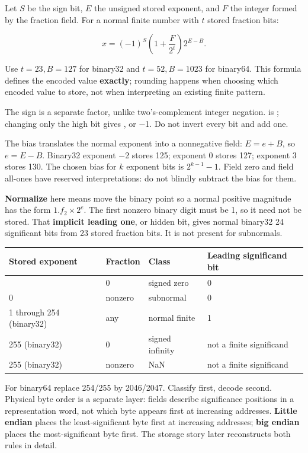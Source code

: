 Let \(S\) be the sign bit, \(E\) the unsigned stored exponent, and \(F\) the integer formed by the fraction field. For a normal finite number with \(t\) stored fraction bits:

\[
x=(-1)^S\left(1+\frac{F}{2^t}\right)2^{E-B}.
\]

Use \(t=23,B=127\) for binary32 and \(t=52,B=1023\) for binary64. This formula defines the encoded value \textbf{exactly}; rounding happens when choosing which encoded value to store, not when interpreting an existing finite pattern.

The sign is a separate factor, unlike two's-complement integer negation.  is ; changing only the high bit gives , or −1. Do not invert every bit and add one.

The bias translates the normal exponent into a nonnegative field: \(E=e+B\), so \(e=E-B\). Binary32 exponent −2 stores 125; exponent 0 stores 127; exponent 3 stores 130. The chosen bias for \(k\) exponent bits is \(2^{k-1}-1\). Field zero and field all-ones have reserved interpretations: do not blindly subtract the bias for them.

\textbf{Normalize} here means move the binary point so a normal positive magnitude has the form \(1.f_2\times2^e\). The first nonzero binary digit must be 1, so it need not be stored. That \textbf{implicit leading one}, or hidden bit, gives normal binary32 24 significant bits from 23 stored fraction bits. It is not present for subnormals.

{\def\LTcaptype{none} %
\begin{longtable}[]{@{}llll@{}}
\toprule\noalign{}
Stored exponent & Fraction & Class & Leading significand bit \\
\midrule\noalign{}
\endhead
\bottomrule\noalign{}
\endlastfoot
0 & 0 & signed zero & 0 \\
0 & nonzero & subnormal & 0 \\
1 through 254 (binary32) & any & normal finite & 1 \\
255 (binary32) & 0 & signed infinity & not a finite significand \\
255 (binary32) & nonzero & NaN & not a finite significand \\
\end{longtable}
}

For binary64 replace 254/255 by 2046/2047. Classify first, decode second. Physical byte order is a separate layer: fields describe significance positions in a representation word, not which byte appears first at increasing addresses. \textbf{Little endian} places the least-significant byte first at increasing addresses; \textbf{big endian} places the most-significant byte first. The storage story later reconstructs both rules in detail.

